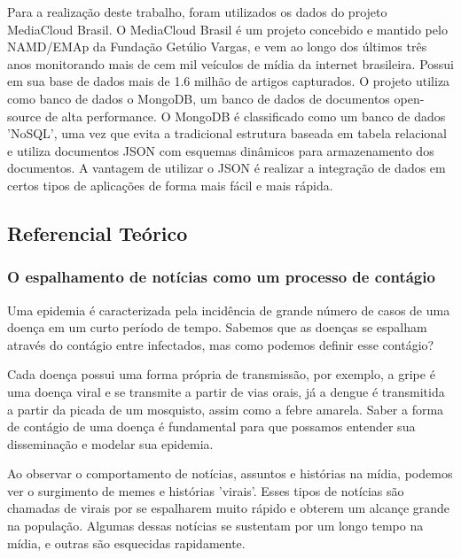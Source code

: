 \documentclass[a4paper,12pt]{article}
\begin{document}
Para a realização deste trabalho, foram utilizados os dados do projeto MediaCloud Brasil. O MediaCloud Brasil é um projeto concebido e mantido pelo
NAMD/EMAp da Fundação Getúlio Vargas, e vem ao longo dos últimos três anos monitorando mais de cem mil veículos de mídia da internet brasileira. Possui em
sua base de dados mais de 1.6 milhão de artigos capturados.
O projeto utiliza como banco de dados o MongoDB, um banco de dados de documentos open-source de alta performance. O MongoDB é classificado como um banco de 
dados 'NoSQL', uma vez que evita a tradicional estrutura  baseada em tabela relacional e utiliza documentos JSON com esquemas dinâmicos para armazenamento 
dos documentos. A vantagem de utilizar o JSON é realizar a integração de dados em certos tipos de aplicações de forma mais fácil e mais rápida.

\subsection{Referencial Teórico}


\subsubsection{O espalhamento de notícias como um processo de contágio}

Uma epidemia é caracterizada pela incidência de grande número de casos de uma doença em um curto período de tempo. Sabemos que as doenças
se espalham através do contágio entre infectados, mas como podemos definir esse contágio? 

Cada doença possui uma forma própria de transmissão, por exemplo, a gripe é uma doença viral e se transmite a partir de vias orais, já a dengue
é transmitida a partir da picada de um mosquisto, assim como a febre amarela. Saber a forma de contágio de uma doença é fundamental para que
possamos entender sua disseminação e modelar sua epidemia.

Ao observar o comportamento de notícias, assuntos e histórias na mídia, podemos ver o surgimento de memes e histórias 'virais'. Esses 
tipos de notícias são chamadas de virais por se espalharem muito rápido e obterem um alcançe grande na população. Algumas dessas notícias
se sustentam por um longo tempo na mídia, e outras são esquecidas rapidamente. 
\end{document}
